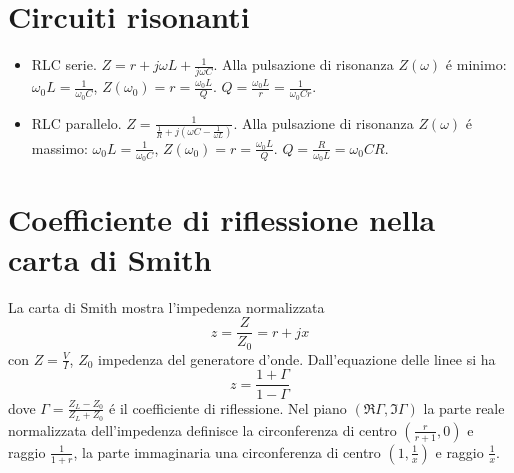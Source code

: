 \documentclass[main.tex]{subfiles}
\begin{document}

\section{Circuiti risonanti}
\begin{itemize}
\item RLC serie. $Z=r+j\omega L+\frac{1}{j\omega C}$. Alla pulsazione di risonanza $Z(\omega)$ \'e minimo: $\omega_0L=\frac{1}{\omega_0C}$, $Z(\omega_0)=r=\frac{\omega_0L}{Q}$. $Q=\frac{\omega_0L}{r}=\frac{1}{\omega_0Cr}$.
\item RLC parallelo. $Z=\frac{1}{\frac{1}{R}+j(\omega C-\frac{1}{\omega L})}$. Alla pulsazione di risonanza $Z(\omega)$ \'e massimo: $\omega_0L=\frac{1}{\omega_0C}$, $Z(\omega_0)=r=\frac{\omega_0L}{Q}$. $Q=\frac{R}{\omega_0L}=\omega_0CR$.
\end{itemize}

\section{Coefficiente di riflessione nella carta di Smith}
La carta di Smith mostra l'impedenza normalizzata
\begin{equation}
z=\frac{Z}{Z_0}=r+jx
\end{equation}
con $Z=\frac{V}{I}$, $Z_0$ impedenza del generatore d'onde. Dall'equazione delle linee si ha
\begin{equation}
z=\frac{1+\Gamma}{1-\Gamma}
\end{equation}
dove $\Gamma=\frac{Z_L-Z_0}{Z_L+Z_0}$ \'e il coefficiente di riflessione.
Nel piano $(\Re{\Gamma},\Im{\Gamma})$ la parte reale normalizzata dell'impedenza definisce la circonferenza di centro $(\frac{r}{r+1},0)$ e raggio $\frac{1}{1+r}$, la parte immaginaria una circonferenza di centro $(1,\frac{1}{x})$ e raggio $\frac{1}{x}$.

\end{document}
